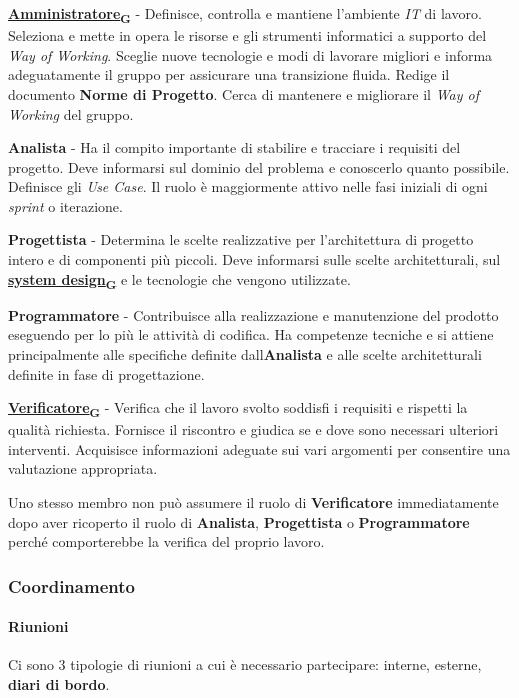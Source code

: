 \documentclass[12pt, a4paper]{article}
\newcommand{\urlglossario}{https://skynetunigroup.github.io/Code_Guardian/Documentazione/RTB/glossario_v1.0.0.pdf} %
\newcommand{\glo}[2]{\href{\urlglossario\#nameddest=#2}{#1\textsubscript{G}}}
\begin{document}
 \textbf{\glo{Amministratore}{amministratore}} - Definisce, controlla e mantiene l'ambiente \textit{IT} di lavoro. Seleziona e mette in opera le risorse e gli strumenti informatici a supporto del \textit{Way of Working}. Sceglie nuove tecnologie e modi di lavorare migliori e informa adeguatamente il gruppo per assicurare una transizione fluida. Redige il documento \textbf{Norme di Progetto}. Cerca di mantenere e migliorare il \textit{Way of Working} del gruppo.
 
 \textbf{Analista} - Ha il compito importante di stabilire e tracciare i requisiti del progetto. Deve informarsi sul dominio del problema e conoscerlo quanto possibile. Definisce gli \textit{Use Case}. Il ruolo è maggiormente attivo nelle fasi iniziali di ogni \textit{sprint} o iterazione.
 
 \textbf{Progettista} - Determina le scelte realizzative per l'architettura di progetto intero e di componenti più piccoli. Deve informarsi sulle scelte architetturali, sul \textbf{\glo{system design}{system-design}} e le tecnologie che vengono utilizzate.
 
 \textbf{Programmatore} - Contribuisce alla realizzazione e manutenzione del prodotto eseguendo per lo più le attività di codifica. Ha competenze tecniche e si attiene principalmente alle specifiche definite dall\textquotesingle \textbf{Analista} e alle scelte architetturali definite in fase di progettazione.
 
 \textbf{\glo{Verificatore}{verificatore}} - Verifica che il lavoro svolto soddisfi i requisiti e rispetti la qualità richiesta. Fornisce il riscontro e giudica se e dove sono necessari ulteriori interventi. Acquisisce informazioni adeguate sui vari argomenti per consentire una valutazione appropriata.
 
 Uno stesso membro non può assumere il ruolo di \textbf{Verificatore} immediatamente dopo aver ricoperto il ruolo di \textbf{Analista}, \textbf{Progettista} o \textbf{Programmatore} perché comporterebbe la verifica del proprio lavoro.

\subsubsection{Coordinamento}

\paragraph{Riunioni}

Ci sono 3 tipologie di riunioni a cui è necessario partecipare: interne, esterne, \textbf{diari di bordo}.
\end{document}
